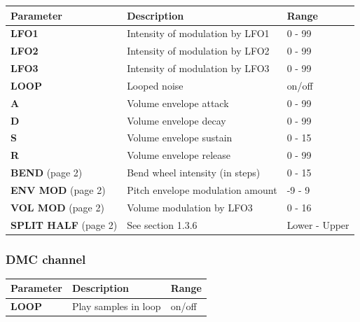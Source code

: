 \documentclass[a4paper, 12p]{extarticle}
\begin{document}
\begin{tabular}{l | l | l}
  Parameter & Description & Range\\ \hline
  \textbf{LFO1} & Intensity of modulation by LFO1 & 0 - 99\\
  \textbf{LFO2} & Intensity of modulation by LFO2 & 0 - 99\\
  \textbf{LFO3} & Intensity of modulation by LFO3 & 0 - 99\\
  \textbf{LOOP} & Looped noise & on/off\\
  \textbf{A} & Volume envelope attack & 0 - 99\\
  \textbf{D} & Volume envelope decay & 0 - 99\\
  \textbf{S} & Volume envelope sustain & 0 - 15\\
  \textbf{R} & Volume envelope release & 0 - 99\\
  \textbf{BEND} (page 2) & Bend wheel intensity (in steps) & 0 - 15\\
  \textbf{ENV MOD} (page 2) & Pitch envelope modulation amount & -9 - 9\\
  \textbf{VOL MOD} (page 2) & Volume modulation by LFO3 & 0 - 16\\
  \textbf{SPLIT HALF} (page 2) & See section 1.3.6 & Lower - Upper\\
\end{tabular}

\subsubsection{DMC channel}


\begin{tabular}{l | l | l}
  Parameter & Description & Range\\ \hline
  \textbf{LOOP} & Play samples in loop & on/off\\
\end{tabular}
\end{document}
